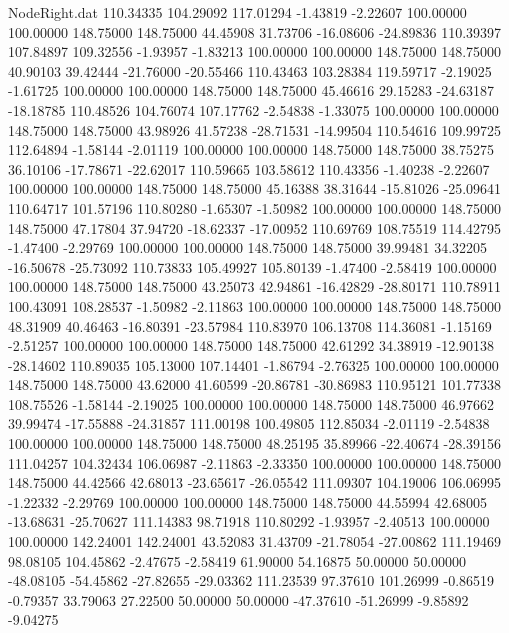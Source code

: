 \begin{filecontents}{NodeRight.dat}
 110.34335  104.29092  117.01294    -1.43819   -2.22607  100.00000  100.00000  148.75000  148.75000   44.45908   31.73706  -16.08606  -24.89836
 110.39397  107.84897  109.32556    -1.93957   -1.83213  100.00000  100.00000  148.75000  148.75000   40.90103   39.42444  -21.76000  -20.55466
 110.43463  103.28384  119.59717    -2.19025   -1.61725  100.00000  100.00000  148.75000  148.75000   45.46616   29.15283  -24.63187  -18.18785
 110.48526  104.76074  107.17762    -2.54838   -1.33075  100.00000  100.00000  148.75000  148.75000   43.98926   41.57238  -28.71531  -14.99504
 110.54616  109.99725  112.64894    -1.58144   -2.01119  100.00000  100.00000  148.75000  148.75000   38.75275   36.10106  -17.78671  -22.62017
 110.59665  103.58612  110.43356    -1.40238   -2.22607  100.00000  100.00000  148.75000  148.75000   45.16388   38.31644  -15.81026  -25.09641
 110.64717  101.57196  110.80280    -1.65307   -1.50982  100.00000  100.00000  148.75000  148.75000   47.17804   37.94720  -18.62337  -17.00952
 110.69769  108.75519  114.42795    -1.47400   -2.29769  100.00000  100.00000  148.75000  148.75000   39.99481   34.32205  -16.50678  -25.73092
 110.73833  105.49927  105.80139    -1.47400   -2.58419  100.00000  100.00000  148.75000  148.75000   43.25073   42.94861  -16.42829  -28.80171
 110.78911  100.43091  108.28537    -1.50982   -2.11863  100.00000  100.00000  148.75000  148.75000   48.31909   40.46463  -16.80391  -23.57984
 110.83970  106.13708  114.36081    -1.15169   -2.51257  100.00000  100.00000  148.75000  148.75000   42.61292   34.38919  -12.90138  -28.14602
 110.89035  105.13000  107.14401    -1.86794   -2.76325  100.00000  100.00000  148.75000  148.75000   43.62000   41.60599  -20.86781  -30.86983
 110.95121  101.77338  108.75526    -1.58144   -2.19025  100.00000  100.00000  148.75000  148.75000   46.97662   39.99474  -17.55888  -24.31857
 111.00198  100.49805  112.85034    -2.01119   -2.54838  100.00000  100.00000  148.75000  148.75000   48.25195   35.89966  -22.40674  -28.39156
 111.04257  104.32434  106.06987    -2.11863   -2.33350  100.00000  100.00000  148.75000  148.75000   44.42566   42.68013  -23.65617  -26.05542
 111.09307  104.19006  106.06995    -1.22332   -2.29769  100.00000  100.00000  148.75000  148.75000   44.55994   42.68005  -13.68631  -25.70627
 111.14383   98.71918  110.80292    -1.93957   -2.40513  100.00000  100.00000  142.24001  142.24001   43.52083   31.43709  -21.78054  -27.00862
 111.19469   98.08105  104.45862    -2.47675   -2.58419   61.90000   54.16875   50.00000   50.00000  -48.08105  -54.45862  -27.82655  -29.03362
 111.23539   97.37610  101.26999    -0.86519   -0.79357   33.79063   27.22500   50.00000   50.00000  -47.37610  -51.26999   -9.85892   -9.04275

\end{filecontents}
